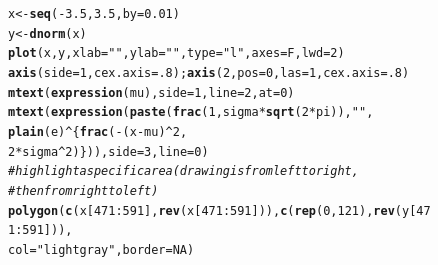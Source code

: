 \documentclass[11pt,a4paper]{memoir}\usepackage[]{graphicx}\usepackage[]{color}
\makeatletter
\newcommand{\hlnum}[1]{\textcolor[rgb]{0.686,0.059,0.569}{#1}}%
\newcommand{\hlstr}[1]{\textcolor[rgb]{0.192,0.494,0.8}{#1}}%
\newcommand{\hlcom}[1]{\textcolor[rgb]{0.678,0.584,0.686}{\textit{#1}}}%
\newcommand{\hlopt}[1]{\textcolor[rgb]{0,0,0}{#1}}%
\newcommand{\hlstd}[1]{\textcolor[rgb]{0.345,0.345,0.345}{#1}}%
\newcommand{\hlkwb}[1]{\textcolor[rgb]{0.69,0.353,0.396}{#1}}%
\newcommand{\hlkwc}[1]{\textcolor[rgb]{0.333,0.667,0.333}{#1}}%
\newcommand{\hlkwd}[1]{\textcolor[rgb]{0.737,0.353,0.396}{\textbf{#1}}}%
\newenvironment{kframe}{%
 \def\at@end@of@kframe{}%
 \ifinner\ifhmode%
  \def\at@end@of@kframe{\end{minipage}}%
  \begin{minipage}{\columnwidth}%
 \fi\fi%
 \def\FrameCommand##1{\hskip\@totalleftmargin \hskip-\fboxsep
 \colorbox{shadecolor}{##1}\hskip-\fboxsep
     \hskip-\linewidth \hskip-\@totalleftmargin \hskip\columnwidth}%
 \MakeFramed {\advance\hsize-\width
   \@totalleftmargin\z@ \linewidth\hsize
   \@setminipage}}%
 {\par\unskip\endMakeFramed%
 \at@end@of@kframe}
\newenvironment{knitrout}{}{} %
\makeatother
\begin{document}
\begin{figure}[htb]
\centering
\begin{knitrout}
\color{fgcolor}\begin{kframe}
\begin{alltt}
\hlstd{x} \hlkwb{<-} \hlkwd{seq}\hlstd{(}\hlopt{-}\hlnum{3.5}\hlstd{,}\hlnum{3.5}\hlstd{,}\hlkwc{by}\hlstd{=}\hlnum{0.01}\hlstd{)}
\hlstd{y} \hlkwb{<-} \hlkwd{dnorm}\hlstd{(x)}
\hlkwd{plot}\hlstd{(x,y,}\hlkwc{xlab}\hlstd{=}\hlstr{""}\hlstd{,}\hlkwc{ylab}\hlstd{=}\hlstr{""}\hlstd{,}\hlkwc{type}\hlstd{=}\hlstr{"l"}\hlstd{,}\hlkwc{axes}\hlstd{=F,}\hlkwc{lwd}\hlstd{=}\hlnum{2}\hlstd{)}
\hlkwd{axis}\hlstd{(}\hlkwc{side}\hlstd{=}\hlnum{1}\hlstd{,}\hlkwc{cex.axis}\hlstd{=}\hlnum{.8}\hlstd{);} \hlkwd{axis}\hlstd{(}\hlnum{2}\hlstd{,}\hlkwc{pos}\hlstd{=}\hlnum{0}\hlstd{,}\hlkwc{las}\hlstd{=}\hlnum{1}\hlstd{,}\hlkwc{cex.axis}\hlstd{=}\hlnum{.8}\hlstd{)}
\hlkwd{mtext}\hlstd{(}\hlkwd{expression}\hlstd{(mu),}\hlkwc{side}\hlstd{=}\hlnum{1}\hlstd{,}\hlkwc{line}\hlstd{=}\hlnum{2}\hlstd{,}\hlkwc{at}\hlstd{=}\hlnum{0}\hlstd{)}
\hlkwd{mtext}\hlstd{(}\hlkwd{expression}\hlstd{(}\hlkwd{paste}\hlstd{(}\hlkwd{frac}\hlstd{(}\hlnum{1}\hlstd{, sigma}\hlopt{*}\hlkwd{sqrt}\hlstd{(}\hlnum{2}\hlopt{*}\hlstd{pi)),} \hlstr{" "}\hlstd{,}
                       \hlkwd{plain}\hlstd{(e)}\hlopt{^}\hlstd{\{}\hlkwd{frac}\hlstd{(}\hlopt{-}\hlstd{(x}\hlopt{-}\hlstd{mu)}\hlopt{^}\hlnum{2}\hlstd{,}
                       \hlnum{2}\hlopt{*}\hlstd{sigma}\hlopt{^}\hlnum{2}\hlstd{)\})),}\hlkwc{side}\hlstd{=}\hlnum{3}\hlstd{,}\hlkwc{line}\hlstd{=}\hlnum{0}\hlstd{)}
\hlcom{# highlight a specific area (drawing is from left to right, }
\hlcom{# then from right to left)}
\hlkwd{polygon}\hlstd{(}\hlkwd{c}\hlstd{(x[}\hlnum{471}\hlopt{:}\hlnum{591}\hlstd{],}\hlkwd{rev}\hlstd{(x[}\hlnum{471}\hlopt{:}\hlnum{591}\hlstd{])),}\hlkwd{c}\hlstd{(}\hlkwd{rep}\hlstd{(}\hlnum{0}\hlstd{,}\hlnum{121}\hlstd{),}\hlkwd{rev}\hlstd{(y[}\hlnum{471}\hlopt{:}\hlnum{591}\hlstd{])),}
        \hlkwc{col}\hlstd{=}\hlstr{"lightgray"}\hlstd{,}\hlkwc{border}\hlstd{=}\hlnum{NA}\hlstd{)}
\end{alltt}
\end{kframe}


\end{knitrout}
\end{figure}
\end{document}
